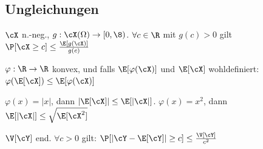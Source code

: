 \subsection{Ungleichungen}
\shorttheorem[Markow] $\cX$ n.-neg., $g : \cX(\Omega) \rightarrow [0, \8)$. $\forall c \in \R$ mit $g(c) > 0$ gilt $\P[\cX \geq c] \leq \frac{\E[g(\cX)]}{g(c)}$

\shorttheorem[Jensensche] $\varphi: \R \rightarrow \R$ konvex, und falls $\E[\varphi(\cX)]$ und $\E[\cX]$ wohldefiniert: $\varphi(\E[\cX]) \leq \E[\varphi(\cX)]$

\shorttheorem[Dreieck] $\varphi(x) = |x|$, dann $|\E[\cX]| \leq \E[|\cX|]$. $\varphi(x) = x^2$, dann $\E[|\cX|] \leq \sqrt{\E[\cX^2]}$

\shortcorollary[Cheb.] $\V[\cY]$ end. $\forall c > 0$ gilt: $\P[|\cY - \E[\cY]| \geq c] \leq \frac{\V[\cY]}{c^2}$
